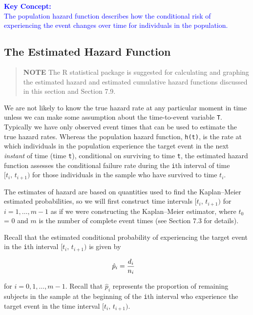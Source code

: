 \documentclass[
]{report}
\begin{document}
\textbf{\textcolor{blue}{Key Concept:}}\\
\textcolor{blue}{The population hazard function describes how the conditional risk of experiencing the event changes over time for individuals in the population.}

\hypertarget{the-estimated-hazard-function}{%
\subsection*{The Estimated Hazard Function}\label{the-estimated-hazard-function}}

\begin{quote}
\textbf{NOTE} The R statistical package is suggested for calculating and graphing the estimated hazard and estimated cumulative hazard functions discussed in this section and Section 7.9.
\end{quote}

We are not likely to know the true hazard rate at any particular moment in time unless we can make some assumption about the time-to-event variable \texttt{T}. Typically we have only observed event times that can be used to estimate the true hazard rates. Whereas the population hazard function, \texttt{h(t)}, is the rate at which individuals in the population experience the target event in the next \emph{instant} of time (time \texttt{t}), conditional on surviving to time \texttt{t}, the estimated hazard function assesses the conditional failure rate during the \texttt{i}th interval of time \(\scriptstyle [t_i,\,t_{i+1})\) for those individuals in the sample who have survived to time \(\scriptstyle t_i\).

The estimates of hazard are based on quantities used to find the Kaplan--Meier estimated probabilities, so we will first construct time intervals \(\scriptstyle [t_i,\,t_{i+1})\) for \(\scriptstyle i = 1,\dots,m-1\) as if we were constructing the Kaplan--Meier estimator, where \(\scriptstyle t_0\) = 0 and \(\scriptstyle m\) is the number of complete event times (see Section 7.3 for details).

Recall that the estimated conditional probability of experiencing the target event in the \texttt{i}th interval \(\scriptstyle [t_i,\,t_{i+1})\) is given by

\begin{align}
\hat p_i &= \frac{d_i}{n_i}
\notag
\end{align}

for \(\scriptstyle i=0,1,\dots,m-1\). Recall that \(\scriptstyle \hat p_i\) represents the proportion of remaining subjects in the sample at the beginning of the \texttt{i}th interval who experience the target event in the time interval \(\scriptstyle [t_i,\,t_{i+1})\).
\end{document}
